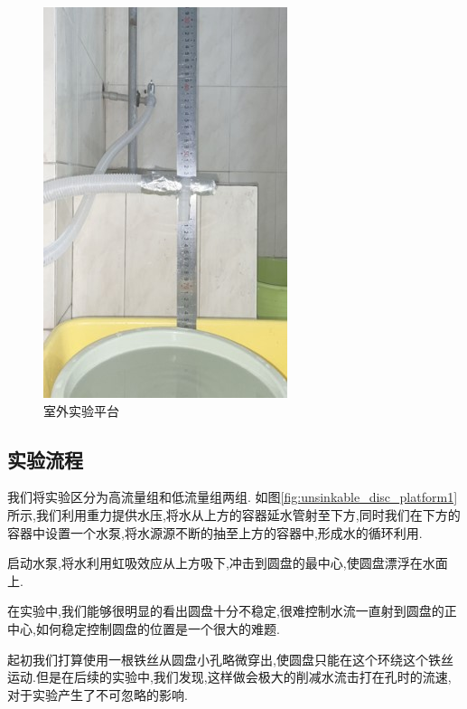\documentclass[UTF8]{gapd}
\begin{document}
\begin{figure}[!htbp]%
  \centering
  \includegraphics[width=0.8\columnwidth]{images/platform2.jpg}
  \caption{室外实验平台}
  \label{fig:unsinkable_disc_platform2}%
\end{figure}

\subsection{实验流程}
我们将实验区分为高流量组和低流量组两组.
如图\ref{fig:unsinkable_disc_platform1}所示,我们利用重力提供水压,将水从上方的容器延水管射至下方,同时我们在下方的容器中设置一个水泵,将水源源不断的抽至上方的容器中,形成水的循环利用.

启动水泵,将水利用虹吸效应从上方吸下,冲击到圆盘的最中心,使圆盘漂浮在水面上.

在实验中,我们能够很明显的看出圆盘十分不稳定,很难控制水流一直射到圆盘的正中心,如何稳定控制圆盘的位置是一个很大的难题.

起初我们打算使用一根铁丝从圆盘小孔略微穿出,使圆盘只能在这个环绕这个铁丝运动.但是在后续的实验中,我们发现,这样做会极大的削减水流击打在孔时的流速,对于实验产生了不可忽略的影响.
\end{document}

